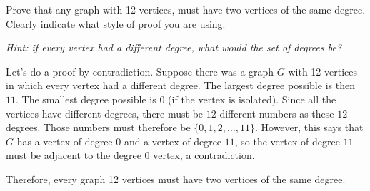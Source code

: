 \documentclass[10pt]{exam}
\begin{document}
\begin{questions}
\question[4] Prove that any graph with 12 vertices, must have two vertices of the same degree.  Clearly indicate what style of proof you are using.

\textit{Hint: if every vertex had a different degree, what would the set of degrees be?}

\begin{solution}
  Let's do a proof by contradiction.  Suppose there was a graph $G$ with 12 vertices in which every vertex had a different degree. The largest degree possible is then $11$.  The smallest degree possible is 0 (if the vertex is isolated).  Since all the vertices have different degrees, there must be $12$ different numbers as these $12$ degrees.  Those numbers must therefore be $\{0, 1, 2, \ldots, 11\}$.  However, this says that $G$ has a vertex of degree 0 and a vertex of degree $11$, so the vertex of degree $11$ must be adjacent to the degree 0 vertex, a contradiction.

  Therefore, every graph 12 vertices must have two vertices of the same degree.
\end{solution}



%
%
%



\end{questions}
\end{document}
